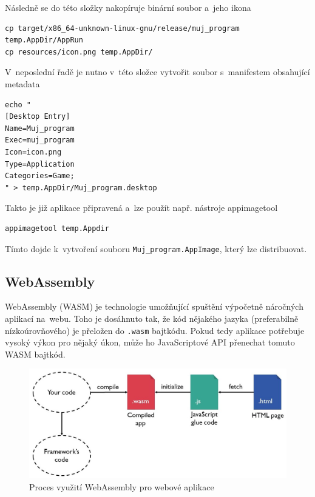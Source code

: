 \documentclass[a4paper, 12pt, twoside]{article} %
\begin{document}
		Následně se do této složky nakopíruje binární soubor a~jeho ikona
		\begin{verbatim}
cp target/x86_64-unknown-linux-gnu/release/muj_program temp.AppDir/AppRun
cp resources/icon.png temp.AppDir/
		\end{verbatim}
		
		V~neposlední řadě je nutno v~této složce vytvořit soubor s~manifestem obsahující metadata
		\begin{verbatim}
echo "
[Desktop Entry]
Name=Muj_program
Exec=muj_program
Icon=icon.png
Type=Application
Categories=Game;
" > temp.AppDir/Muj_program.desktop
		\end{verbatim}

		Takto je již aplikace připravená a~lze použít např. nástroje appimagetool\cite{appimagetool}
		\begin{verbatim}
appimagetool temp.Appdir
		\end{verbatim}

		Tímto dojde k~vytvoření souboru \texttt{Muj\_program.AppImage}, který lze distribuovat.


	\subsection{WebAssembly}
		WebAssembly (WASM) je technologie umožňující spuštění výpočetně náročných aplikací na~webu. Toho je dosáhnuto tak, že kód nějakého jazyka (preferabilně nízkoúrovňového) je přeložen do \texttt{.wasm} bajtkódu. Pokud tedy aplikace potřebuje vysoký výkon pro nějaký úkon, může ho JavaScriptové API přenechat tomuto WASM bajtkód.\cite{wasm}
		
		\begin{center}
			\begin{figure}[H]
				\centering
				\includegraphics[width=13cm]{wasm}
				\caption{Proces využití WebAssembly pro webové aplikace \cite{wasm_fig}}
				\label{fig:wasm}
			\end{figure}
		\end{center}
		
\end{document}
